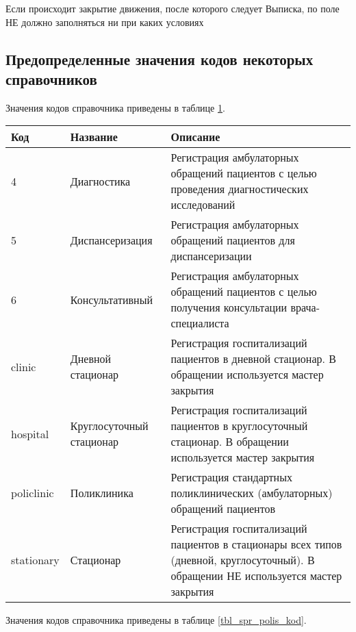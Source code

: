 \begin{vnim}
Если происходит закрытие движения, после которого следует Выписка, по поле  НЕ должно заполняться ни при каких условиях
\end{vnim}

\subsection{Предопределенные значения кодов некоторых справочников}

Значения кодов справочника  приведены в таблице \ref{tbl_spr_tpobr_kod}.

{\small
\begin{table}[ht!]
 \label{tbl_spr_tpobr_kod} 
 \begin{tabular}{|p{2cm}|p{4cm}|p{10.5cm}|}
  \hline \rule{0pt}{15pt} \centering \textbf{Код} & \centering \textbf{Название} & \hfil \textbf{Описание} \\ \hline
  4	& Диагностика	& Регистрация амбулаторных обращений пациентов с целью проведения диагностических исследований  \\ \hline
  5	& Диспансеризация	& Регистрация амбулаторных обращений пациентов для диспансеризации \\ \hline
  6	& Консультативный	& Регистрация амбулаторных обращений пациентов с целью получения консультации врача-специалиста \\ \hline
  clinic	& Дневной стационар	& Регистрация госпитализаций пациентов в дневной стационар. В обращении используется мастер закрытия \\ \hline
  hospital	& Круглосуточный стационар &	Регистрация госпитализаций пациентов в круглосуточный стационар. В обращении используется мастер закрытия \\ \hline
  policlinic	& Поликлиника	& Регистрация стандартных поликлинических (амбулаторных) обращений пациентов  \\ \hline
  stationary	& Стационар	& Регистрация госпитализаций пациентов в стационары всех типов (дневной, круглосуточный). В обращении НЕ используется мастер закрытия \\ \hline  
 \end{tabular}
\end{table}
}

Значения кодов справочника  приведены в таблице \ref{tbl_spr_polis_kod}.

